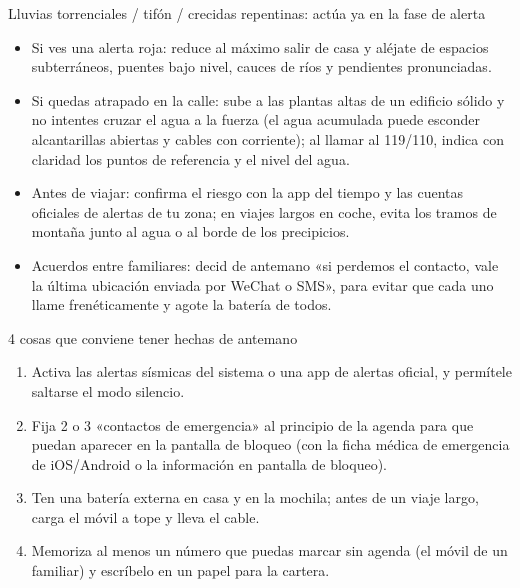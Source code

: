 \begin{tcbwarn}{Lluvias torrenciales / tifón / crecidas repentinas: actúa ya en la fase de alerta}
\begin{itemize}
  \item Si ves una alerta roja: reduce al máximo salir de casa y aléjate de espacios subterráneos, puentes bajo nivel, cauces de ríos y pendientes pronunciadas.
  \item Si quedas atrapado en la calle: sube a las plantas altas de un edificio sólido y no intentes cruzar el agua a la fuerza (el agua acumulada puede esconder alcantarillas abiertas y cables con corriente); al llamar al 119/110, indica con claridad los puntos de referencia y el nivel del agua.
  \item Antes de viajar: confirma el riesgo con la app del tiempo y las cuentas oficiales de alertas de tu zona; en viajes largos en coche, evita los tramos de montaña junto al agua o al borde de los precipicios.
  \item Acuerdos entre familiares: decid de antemano «si perdemos el contacto, vale la última ubicación enviada por WeChat o SMS», para evitar que cada uno llame frenéticamente y agote la batería de todos.
\end{itemize}

\end{tcbwarn}

\begin{tcbpractice}{4 cosas que conviene tener hechas de antemano}
\begin{enumerate}
  \item Activa las alertas sísmicas del sistema o una app de alertas oficial, y permítele saltarse el modo silencio.
  \item Fija 2 o 3 «contactos de emergencia» al principio de la agenda para que puedan aparecer en la pantalla de bloqueo (con la ficha médica de emergencia de iOS/Android o la información en pantalla de bloqueo).
  \item Ten una batería externa en casa y en la mochila; antes de un viaje largo, carga el móvil a tope y lleva el cable.
  \item Memoriza al menos un número que puedas marcar sin agenda (el móvil de un familiar) y escríbelo en un papel para la cartera.
\end{enumerate}

\end{tcbpractice}



